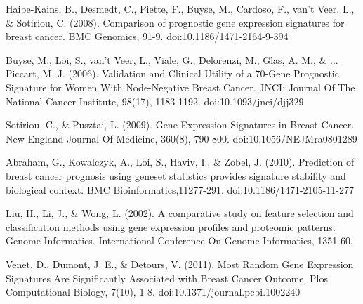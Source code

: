\documentclass[11pt]{article}
\begin{document}
\begin{thebibliography}{9}
 Haibe-Kains, B., Desmedt, C., Piette, F., Buyse, M., Cardoso, F., van't Veer, L., \& Sotiriou, C. (2008). Comparison of prognostic gene expression signatures for breast cancer. BMC Genomics, 91-9. doi:10.1186/1471-2164-9-394

 Buyse, M., Loi, S., van't Veer, L., Viale, G., Delorenzi, M., Glas, A. M., \& ... Piccart, M. J. (2006). Validation and Clinical Utility of a 70-Gene Prognostic Signature for Women With Node-Negative Breast Cancer. JNCI: Journal Of The National Cancer Institute, 98(17), 1183-1192. doi:10.1093/jnci/djj329

 Sotiriou, C., \& Pusztai, L. (2009). Gene-Expression Signatures in Breast Cancer. New England Journal Of Medicine, 360(8), 790-800. doi:10.1056/NEJMra0801289

 Abraham, G., Kowalczyk, A., Loi, S., Haviv, I., \& Zobel, J. (2010). Prediction of breast cancer prognosis using geneset statistics provides signature stability and biological context. BMC Bioinformatics,11277-291. doi:10.1186/1471-2105-11-277

 Liu, H., Li, J., \& Wong, L. (2002). A comparative study on feature selection and classification methods using gene expression profiles and proteomic patterns. Genome Informatics. International Conference On Genome Informatics, 1351-60.

 Venet, D., Dumont, J. E., \& Detours, V. (2011). Most Random Gene Expression Signatures Are Significantly Associated with Breast Cancer Outcome. Plos Computational Biology, 7(10), 1-8. doi:10.1371/journal.pcbi.1002240

\end{thebibliography}
\end{document}
